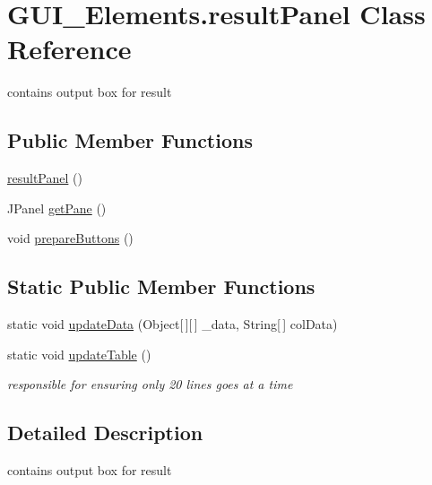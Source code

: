 \hypertarget{class_g_u_i___elements_1_1result_panel}{}\section{G\+U\+I\+\_\+\+Elements.\+result\+Panel Class Reference}
\label{class_g_u_i___elements_1_1result_panel}


contains output box for result  


\subsection*{Public Member Functions}
\begin{DoxyCompactItemize}
\item 
\hyperlink{class_g_u_i___elements_1_1result_panel_ae3658e3ae9e9685a8313ddc8f76426bf}{result\+Panel} ()
\item 
J\+Panel \hyperlink{class_g_u_i___elements_1_1result_panel_ad5c462dff38294c96ee565dc5f258566}{get\+Pane} ()
\item 
void \hyperlink{class_g_u_i___elements_1_1result_panel_abba17e8bbb434ee86c7f95d00167c99d}{prepare\+Buttons} ()
\end{DoxyCompactItemize}
\subsection*{Static Public Member Functions}
\begin{DoxyCompactItemize}
\item 
static void \hyperlink{class_g_u_i___elements_1_1result_panel_a1f5c577e0d7335cca042570a2d406c01}{update\+Data} (Object\mbox{[}$\,$\mbox{]}\mbox{[}$\,$\mbox{]} \+\_\+data, String\mbox{[}$\,$\mbox{]} col\+Data)
\item 
static void \hyperlink{class_g_u_i___elements_1_1result_panel_a9b7265b21d672434bb1d53273ea82590}{update\+Table} ()
\begin{DoxyCompactList}\small\item\em responsible for ensuring only 20 lines goes at a time \end{DoxyCompactList}\end{DoxyCompactItemize}


\subsection{Detailed Description}
contains output box for result 

